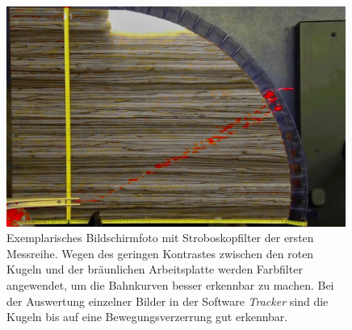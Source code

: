 \begin{figure}[htb!p]
\centering
 \includegraphics[width=0.99\textwidth]{images/strobe1.jpg}
  \caption[Exemplarische Stroboskopaufnahme der ersten Messreihe]{Exemplarisches Bildschirmfoto mit Stroboskopfilter der ersten Messreihe. Wegen des geringen Kontrastes zwischen den roten Kugeln und der bräunlichen Arbeitsplatte werden Farbfilter angewendet, um die Bahnkurven besser erkennbar zu machen. Bei der Auswertung einzelner Bilder in der Software \textit{Tracker} sind die Kugeln bis auf eine Bewegungsverzerrung gut erkennbar.}
  \label{fig:strobe1}
  \vspace{-0pt}
\end{figure}